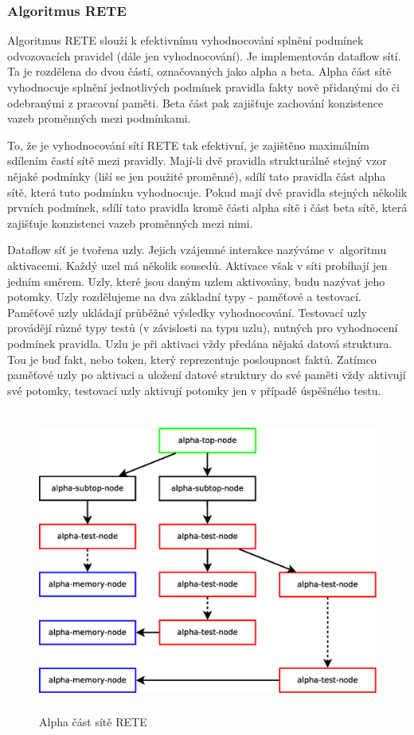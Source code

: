 \subsubsection{Algoritmus RETE}
\label{rete}

Algoritmus RETE slouží k efektivnímu vyhodnocování splnění podmínek odvozovacích
pravidel (dále jen vyhodnocování). Je implementován dataflow sítí. Ta je
rozdělena do dvou částí, označovaných jako alpha a beta. Alpha část sítě
vyhodnocuje splnění jednotlivých podmínek pravidla fakty nově přidanými do či
odebranými z pracovní paměti. Beta část pak zajišťuje zachování konzistence
vazeb proměnných mezi podmínkami.

To, že je vyhodnocování sítí RETE tak efektivní, je zajištěno maximálním
sdílením častí sítě mezi pravidly. Mají-li dvě pravidla strukturálně stejný vzor
nějaké podmínky (liší se jen použité proměnné), sdílí tato pravidla část alpha
sítě, která tuto podmínku vyhodnocuje. Pokud mají dvě pravidla stejných několik
prvních podmínek, sdílí tato pravidla kromě části alpha sítě i část beta sítě,
která zajišťuje konzistenci vazeb proměnných mezi nimi.

Dataflow síť je tvořena uzly. Jejich vzájemné interakce nazýváme
v~algoritmu aktivacemi. Každý uzel má několik sousedů. Aktivace však v síti
probíhají jen jedním směrem. Uzly, které jsou daným uzlem aktivovány, budu
nazývat jeho potomky. Uzly rozdělujeme na dva základní typy - paměťové a
testovací. Paměťové uzly ukládají průběžné výsledky vyhodnocování. Testovací
uzly provádějí různé typy testů (v závislosti na typu uzlu), nutných pro
vyhodnocení podmínek pravidla.  Uzlu je při aktivaci vždy předána nějaká datová
struktura. Tou je buď fakt, nebo token, který reprezentuje posloupnost faktů.
Zatímco paměťové uzly po aktivaci a uložení datové struktury do své paměti vždy
aktivují své potomky, testovací uzly aktivují potomky jen v případě úspěšného
testu.

\begin{figure}[h]
\centering
\includegraphics[height=10cm]{rete-alpha.eps}
\caption{Alpha část sítě RETE}
\label{rete-alpha}
\end{figure}

